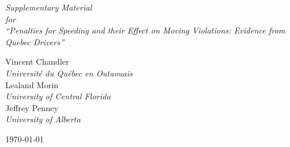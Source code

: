\phantom{0}
\vspace{1.0in}


\begin{centering}

{\huge \it
Supplementary Material  \\
\vspace{0.5in}
for \\
\vspace{0.5in}
``Penalties for Speeding and their Effect on Moving Violations: Evidence from Quebec Drivers'' \\
}

\vspace{1.0in}


{\large 
Vincent Chandler \\
{\it Universit\'{e} du Qu\'{e}bec en Outaouais} \\
\bigskip
Lealand Morin \\
{\it University of Central Florida} \\
\bigskip
Jeffrey Penney \\
{\it University of Alberta} \\
}

\vspace{1.0in}



\today

\end{centering}

